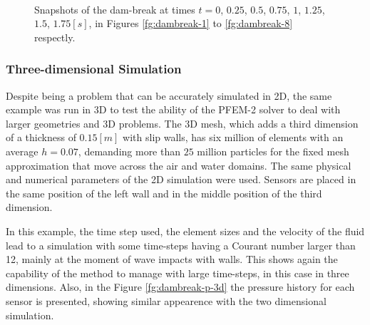 \begin{figure}[H]
{    } \\
   \caption{Snapshots of the dam-break at times $t=0$, $0.25$, $0.5$, $0.75$, $1$, $1.25$, $1.5$, $1.75[s]$, in Figures \ref{fg:dambreak-1} to \ref{fg:dambreak-8} respectly.}
   \label{fg:dambreak-screenshots}
\end{figure}
\clearpage

\subsubsection{Three-dimensional Simulation}\label{sec:ETSIN-3d}

Despite being a problem that can be accurately simulated in 2D, the same example was run in 3D to test the ability of the PFEM-2 solver to deal with larger geometries and 3D problems. The 3D mesh, which adds a third dimension of a thickness of $0.15[m]$ with slip walls, has six million of elements with an average $h=0.07$, demanding more than $25$ million particles for the fixed mesh approximation that move across the air and water domains. The same physical and numerical parameters of the 2D simulation were used. Sensors are placed in the same position of the left wall and in the middle position of the third dimension.

In this example, the time step used, the element sizes and the velocity of the fluid lead to a simulation with some time-steps having a Courant number larger than 12, mainly at the moment of wave impacts with walls. This shows again the capability of the method to manage with large time-steps, in this case in three dimensions. Also, in the Figure \ref{fg:dambreak-p-3d} the pressure history for each sensor is presented, showing similar appearence with the two dimensional simulation. 

